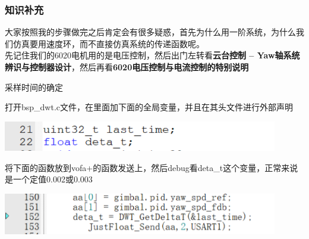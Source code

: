 \documentclass[UTF8,a4paper,12pt]{ctexart}
\begin{document}
    \subsubsection{知识补充}
    \begin{flushleft}
      大家按照我的步骤做完之后肯定会有很多疑惑，首先为什么用一阶系统，为什么我们仿真要用速度环，而不直接仿真系统的传递函数呢。
      \\先记住我们的6020电机用的是电压控制，然后出门左转看\textbf{云台控制 -- Yaw轴系统辨识与控制器设计}，然后再看\textbf{6020电压控制与电流控制的特别说明}
    \end{flushleft}
    \begin{titlebox}{采样时间的确定}
      \begin{flushleft}
         打开bsp\_dwt.c文件，在里面加下面的全局变量，并且在其头文件进行外部声明
      \end{flushleft}
      \par \includegraphics[width=12cm]{picture/variable.png}
      \\
      \begin{flushleft}
        将下面的函数放到vofa+的函数发送上，然后debug看deta\_t这个变量，正常来说是一个定值0.002或0.003
        \par \includegraphics[width=12cm]{picture/variable_1.png}
      \end{flushleft}
    \end{titlebox}
    
\end{document}
